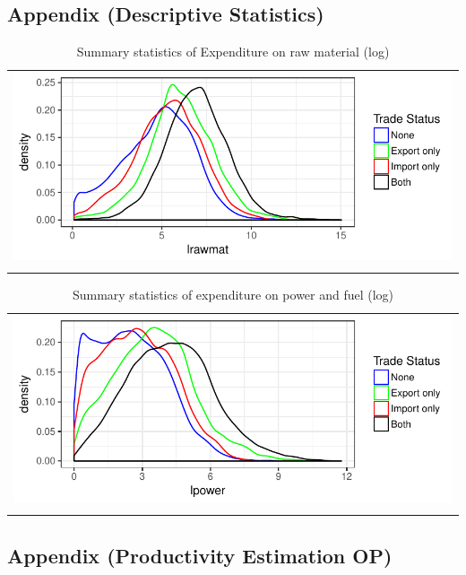 \documentclass[12pt]{article}
\begin{document}
\subsection{Appendix (Descriptive Statistics)}
\begin{center}
\begin{table}[H]
\caption{Summary statistics of Expenditure on raw material (log)}
\label{tab:lrawmat}
\begin{tabular}{c}
 \includegraphics{./PICS/denslrawmat.pdf}   \\ 
   \\  
\end{tabular}
\end{table}
\end{center}


\begin{center}
\begin{table}[H]
\caption{Summary statistics of expenditure on power and fuel (log)}
\begin{tabular}{c}
 \includegraphics{./PICS/denslpower.pdf}   \\ 
   \\  
\end{tabular}
\end{table}
\end{center}

\subsection{Appendix (Productivity Estimation OP)}\label{prodest}
\label{op}
\end{document}

